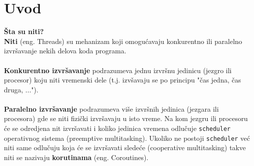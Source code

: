 \section{Uvod}
\textbf{\v{S}ta su niti?}\\
\textbf{Niti} (eng. Threads) su mehanizam koji omogu\'{c}avaju konkurentno ili paralelno izvr\v{s}avanje nekih delova koda programa.\\\\
\textbf{Konkurentno izvr\v{s}avanje} podrazumeva jednu izvr\v{s}nu jedinicu (jezgro ili procesor) koju niti vremenski dele (t.j. izv\v{s}avaju se po principu "\v{c}as jedna, \v{c}as druga, ..."). \\\\
\textbf{Paralelno izvr\v{s}avanje} podrazumeva vi\v{s}e izvr\v{s}nih jedinica (jezgara ili procesora) gde se niti fizi\v{c}ki izvr\v{s}avaju u isto vreme. Na kom jezgru ili procesoru \'{c}e se odredjena nit izvr\v{s}avati i koliko jedinica vremena odlu\v{c}uje \texttt{scheduler} operativnog sistema (preemptive multitasking). Ukoliko ne postoji \texttt{scheduler} ve\'{c} niti same odlu\v{c}uju koja \'{c}e se izvr\v{s}avati slede\'{c}e (cooperative multitasking) takve niti se nazivaju \textbf{korutinama} (eng. Coroutines).

